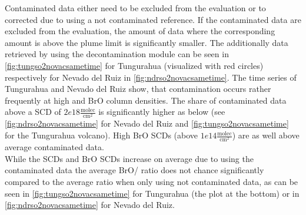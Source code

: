 \documentclass  [
  paper    = a4,
  BCOR     = 10mm,
  twoside,
  fontsize = 12pt,
  fleqn,
  toc      = bibnumbered,
  toc      = listofnumbered,
  numbers  = noendperiod,
  headings = normal,
  listof   = leveldown,
  version  = 3.03
]                                       {scrreprt}
\begin{document}
	Contaminated data either need to be excluded from the evaluation or to corrected due to using a not contaminated reference. If the contaminated data are excluded from the evaluation, the amount of data where the corresponding  amount is above the plume limit is significantly smaller. The additionally data retrieved by using the decontamination module can be seen in \cref{fig:tungso2novacsametime} for Tungurahua (visualized with red circles) respectively for Nevado del Ruiz in \cref{fig:ndrso2novacsametime}.
	The time series of Tungurahua and Nevado del Ruiz show, that contamination occurs rather frequently at high  and BrO column densities. The share of contaminated data above a  SCD of $2e18\frac{\text{molec}}{\text{cm}^2}$ is significantly higher as below (see \cref{fig:ndrso2novacsametime} for Nevado del Ruiz and \cref{fig:tungso2novacsametime} for the Tungurahua volcano). High BrO SCDs (above $1e14\frac{\text{molec}}{\text{cm}^2}$) are as well above average contaminated data.\\
	While the  SCDs and BrO SCDs increase on average due to using the contaminated data the average BrO/ ratio does not chance significantly compared to the average ratio when only using not contaminated data, as can be seen in \cref{fig:tungso2novacsametime} for Tungurahua (the plot at the bottom) or in \cref{fig:ndrso2novacsametime} for Nevado del Ruiz.\\

	
	
\end{document}
